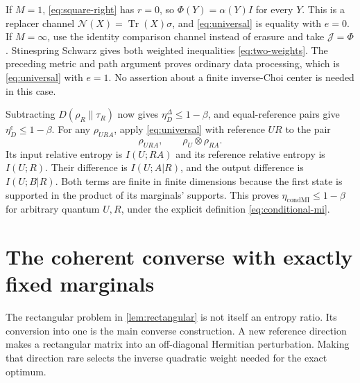 \documentclass[11pt]{article}
\numberwithin{equation}{section}
\theoremstyle{definition}
\theoremstyle{remark}
\DeclareMathOperator{\Tr}{Tr}
\newcommand{\N}{\mathcal N}
\newcommand{\etaC}{\eta_D^{\mathrm c}}
\newcommand{\etaDel}{\eta_D^{\Delta}}
\newcommand{\etaCM}{\eta_{\mathrm{condMI}}}
\begin{document}
If $M=1$, \eqref{eq:square-right} has $r=0$, so
$\Phi(Y)=\alpha(Y)I$ for every $Y$. This is a replacer channel
$\N(X)=\Tr(X)\sigma$, and \eqref{eq:universal} is equality with $e=0$.
If $M=\infty$, use the identity comparison channel instead of erasure and
take $\mathcal J=\Phi$. Stinespring Schwarz gives both weighted
inequalities \eqref{eq:two-weights}. The preceding metric and path
argument proves ordinary data processing, which is \eqref{eq:universal}
with $e=1$. No assertion about a finite inverse-Choi center is needed in
this case.

Subtracting $D(\rho_R\|\tau_R)$ now gives
$\etaDel\leq1-\beta$, and equal-reference pairs give
$\etaC\leq1-\beta$.
For any $\rho_{URA}$, apply \eqref{eq:universal} with reference $UR$ to
the pair
\[
 \rho_{URA},\qquad \rho_U\otimes\rho_{RA}.
\]
Its input relative entropy is $I(U;RA)$ and its reference relative entropy
is $I(U;R)$. Their difference is $I(U;A|R)$, and the output difference
is $I(U;B|R)$. Both terms are finite in finite dimensions because the
first state is supported in the product of its marginals' supports.
This proves $\etaCM\leq1-\beta$ for arbitrary quantum $U,R$, under the
explicit definition \eqref{eq:conditional-mi}.

\section{The coherent converse with exactly fixed marginals}
\label{sec:converse}

The rectangular problem in \cref{lem:rectangular} is not itself an entropy
ratio. Its conversion into one is the main converse construction. A new
reference direction makes a rectangular matrix into an off-diagonal
Hermitian perturbation. Making that direction rare selects the inverse
quadratic weight needed for the exact optimum.
\end{document}
